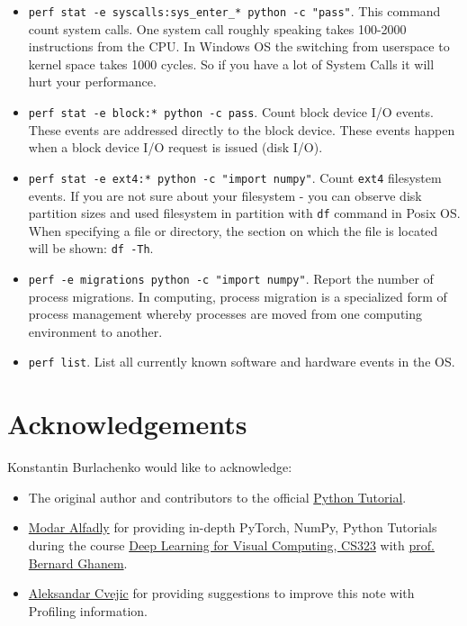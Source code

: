 \documentclass[
]{article}
\begin{document}
\begin{itemize}
\item
  \texttt{perf\ stat\ -e\ \textquotesingle{}syscalls:sys\_enter\_*\textquotesingle{}\ python\ -c\ "pass"}.
  This command count system calls. One system call roughly speaking
  takes 100-2000 instructions from the CPU. In Windows OS the switching
  from userspace to kernel space takes 1000 cycles. So if you have a lot
  of System Calls it will hurt your performance.
\item
  \texttt{perf\ stat\ -e\ \textquotesingle{}block:*\textquotesingle{}\ python\ -c\ pass}.
  Count block device I/O events. These events are addressed directly to
  the block device. These events happen when a block device I/O request
  is issued (disk I/O).
\item
  \texttt{perf\ stat\ -e\ \textquotesingle{}ext4:*\textquotesingle{}\ python\ -c\ "import\ numpy"}.
  Count \texttt{ext4} filesystem events. If you are not sure about your
  filesystem - you can observe disk partition sizes and used filesystem
  in partition with \texttt{df} command in Posix OS. When specifying a
  file or directory, the section on which the file is located will be
  shown: \texttt{df\ -Th}.
\item
  \texttt{perf\ -e\ migrations\ python\ -c\ "import\ numpy"}. Report the
  number of process migrations. In computing, process migration is a
  specialized form of process management whereby processes are moved
  from one computing environment to another.
\item
  \texttt{perf\ list}. List all currently known software and hardware
  events in the OS.
\end{itemize}

\hypertarget{acknowledgements}{%
\section{Acknowledgements}\label{acknowledgements}}

Konstantin Burlachenko would like to acknowledge:

\begin{itemize}
\item
  The original author and contributors to the official
  \href{https://docs.python.org/3/tutorial/index.html}{Python Tutorial}.
\item
  \href{https://cemse.kaust.edu.sa/cs/people/modar-alfadly}{Modar
  Alfadly} for providing in-depth PyTorch, NumPy, Python Tutorials
  during the course
  \href{https://registrar-programguide.kaust.edu.sa/2021-2022/Program-Guide/Courses/CS-Computer-Science/300/CS-323}{Deep
  Learning for Visual Computing, CS323} with
  \href{https://www.bernardghanem.com/}{prof. Bernard Ghanem}.
\item
  \href{https://cemse.kaust.edu.sa/vcc/people/person/aleksandar-cvejic}{Aleksandar
  Cvejic} for providing suggestions to improve this note with Profiling
  information.
\end{itemize}
\end{document}
